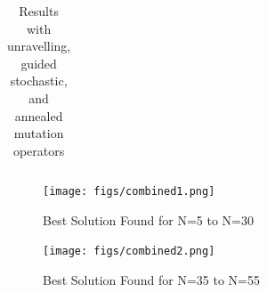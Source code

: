 \documentclass{article}
\begin{document}
\begin{table}[]
\begin{tabular}{cccc|cccc}
	\hline 
	\end{tabular}
	\caption{Results with unravelling, guided stochastic, and annealed mutation
	operators}
 \end{table}

 \begin{figure}
	\texttt{[image: figs/combined1.png]}
	\caption{Best Solution Found for N=5 to N=30}
	\label{fig:combined1}
\end{figure}

 \begin{figure}
	\texttt{[image: figs/combined2.png]}
	\caption{Best Solution Found for N=35 to N=55}
	\label{fig:combined2}
\end{figure}




\pagebreak

\printbibliography
\end{document}
